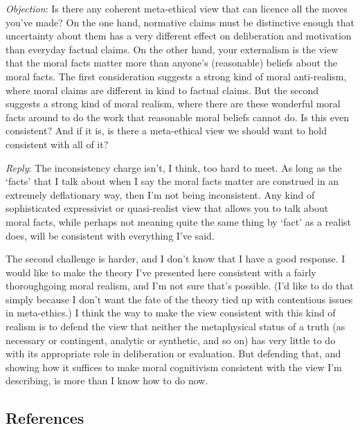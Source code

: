 \documentclass[
  10pt,
  letterpaper,
  DIV=11,
  numbers=noendperiod,
  twoside]{scrartcl}
\begin{document}
\emph{Objection}: Is there any coherent meta-ethical view that can
licence all the moves you've made? On the one hand, normative claims
must be distinctive enough that uncertainty about them has a very
different effect on deliberation and motivation than everyday factual
claims. On the other hand, your externalism is the view that the moral
facts matter more than anyone's (reasonable) beliefs about the moral
facts. The first consideration suggests a strong kind of moral
anti-realism, where moral claims are different in kind to factual
claims. But the second suggests a strong kind of moral realism, where
there are these wonderful moral facts around to do the work that
reasonable moral beliefs cannot do. Is this even consistent? And if it
is, is there a meta-ethical view we should want to hold consistent with
all of it?

\emph{Reply}: The inconsistency charge isn't, I think, too hard to meet.
As long as the `facts' that I talk about when I say the moral facts
matter are construed in an extremely deflationary way, then I'm not
being inconsistent. Any kind of sophisticated expressivist or
quasi-realist view that allows you to talk about moral facts, while
perhaps not meaning quite the same thing by `fact' as a realist does,
will be consistent with everything I've said.

The second challenge is harder, and I don't know that I have a good
response. I would like to make the theory I've presented here consistent
with a fairly thoroughgoing moral realism, and I'm not sure that's
possible. (I'd like to do that simply because I don't want the fate of
the theory tied up with contentious issues in meta-ethics.) I think the
way to make the view consistent with this kind of realism is to defend
the view that neither the metaphysical status of a truth (as necessary
or contingent, analytic or synthetic, and so on) has very little to do
with its appropriate role in deliberation or evaluation. But defending
that, and showing how it suffices to make moral cognitivism consistent
with the view I'm describing, is more than I know how to do now.

\subsection*{References}\label{references}
\end{document}
